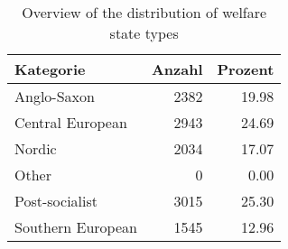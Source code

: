 \begin{table}[H]
\centering
\caption{Overview of the distribution of welfare state types}
\centering
\begin{tabular}[t]{lrr}
\toprule
Kategorie & Anzahl & Prozent\\
\midrule
Anglo-Saxon & 2382 & 19.98\\
Central European & 2943 & 24.69\\
Nordic & 2034 & 17.07\\
Other & 0 & 0.00\\
Post-socialist & 3015 & 25.30\\
\addlinespace
Southern European & 1545 & 12.96\\
\bottomrule
\end{tabular}
\label{tab:variables_welfarestate}
\end{table}
